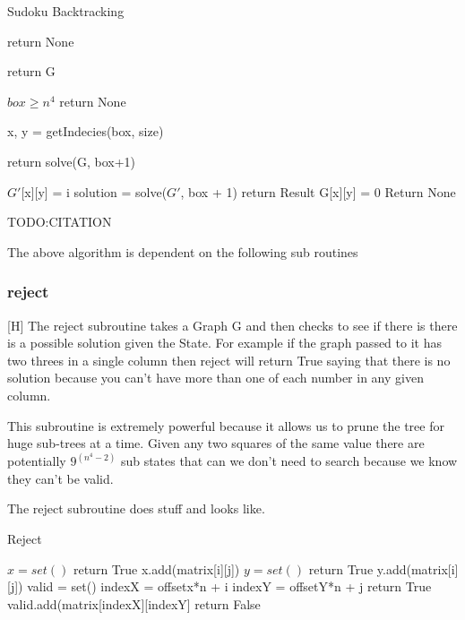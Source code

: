 \documentclass{sig-alternate}
\begin{document}
\begin{algorithm}
\caption{Sudoku Backtracking}\label{solve}
\begin{algorithmic}[1]

\State return None
\EndIf

\State return G
\EndIf

\If $box \ge n^4$
\State return None
\EndIf

\State x, y = getIndecies(box, size)

\State return solve(G, box+1)
\EndIf

\State $G'$[x][y] = i
\State solution = solve($G'$, box + 1)
\State return Result
\EndIf
\EndFor
\State G[x][y] = 0
\State Return None
\EndProcedure
\end{algorithmic}
\end{algorithm}
TODO:CITATION

The above algorithm is dependent on the following sub routines

\subsubsection{reject}[H]
The reject subroutine takes a Graph G and then checks to see if there is there is
a possible solution given the State. For example if the graph passed to it has two threes in a single column then reject will return True saying that there is no solution because you can't have more than one of each number in any given column. 

This subroutine is extremely powerful because it allows us to prune the tree for huge sub-trees at a time. Given any two squares of the same value there are potentially $9^(n^4 - 2)$ sub states that can we don't need to search because we know they can't be valid. 

The reject subroutine does stuff and looks like.

\begin{algorithm}
\caption{Reject}\label{reject}
\begin{algorithmic}[1]
\State $x = set()$
\State return True
\EndIf
\State x.add(matrix[i][j])
\EndIf
\EndFor
\EndFor
{}
\State $y = set()$
\State return True
\EndIf
\State y.add(matrix[i][j])
\EndIf
\EndFor
\EndFor
{}
\State valid = set()
\State indexX = offsetx*n + i
\State indexY = offsetY*n + j
\State return True
\EndIf
\State valid.add(matrix[indexX][indexY]
\EndIf
\EndFor
\EndFor
\EndFor
\EndFor
\State return False
\EndProcedure
\end{algorithmic}
\end{algorithm}
\end{document}
